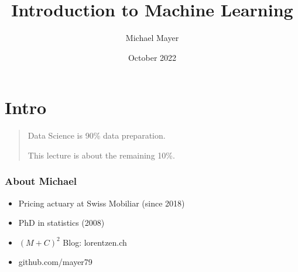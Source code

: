 \documentclass[
    utf8,
    aspectratio=169
]{beamer}  %
\title{Introduction to Machine Learning}
\author{Michael Mayer}
\date{October 2022}
\begin{document}

\frame{\titlepage}


\section{Intro}

\begin{frame}
\begin{quotation}
	\begin{huge}
		\begin{center}
			Data Science is 90\% data preparation.
	
			This lecture is about the remaining 10\%.
		\end{center}
	\end{huge}
\end{quotation}
\end{frame}

\begin{frame}
\frametitle{About Michael}
\begin{itemize}
	\item Pricing actuary at Swiss Mobiliar (since 2018)
	\item PhD in statistics (2008)
	\item $(M+C)^2$ Blog: lorentzen.ch
	\item github.com/mayer79
\end{itemize}
\end{frame}
\end{document}
